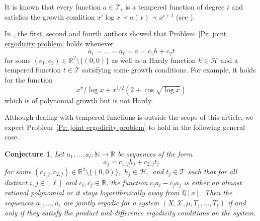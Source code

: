 \documentclass[11pt]{amsart}
\newtheorem{conjecture}[lemma]{Conjecture}
\theoremstyle{definition}
\newcommand{\N}{{\mathbb N}}
\newcommand{\Q}{{\mathbb Q}}
\newcommand{\R}{{\mathbb R}}
\newcommand{\CH}{{\mathcal H}}
\newcommand{\CX}{{\mathcal X}}
\newcommand{\1}{{\mathbf{1}}}
\begin{document}
It is known that every function $a\in \mathcal{T}_i$ is a tempered function of degree $i$ and satisfies the growth condition $x^i\log x\prec a(x)\prec x^{i+1}$ (see \cite{BeHK09}).

In \cite{DKS23}, the first, second and fourth authors showed that Problem~\ref{Pr: joint ergodicity problem} holds whenever $$a_1=\ldots=a_\ell=a=c_1h+c_2t$$ for some $(c_1,c_2)\in \mathbb{R}^2\setminus\{(0,0)\}$ as well as a Hardy function $h\in \CH$ and a tempered function $t\in \mathcal{T}$ satisfying some growth conditions. 
For example, it holds for the function 
\[x^{\pi}/ \log x+x^{1/2}(2+\cos\sqrt{\log x})\] which is of polynomial growth but is not Hardy.

Although dealing with tempered functions is outside the scope of this article, we expect Problem~\ref{Pr: joint ergodicity problem} to hold in the following general case.

\begin{conjecture}
Let $a_1, \ldots, a_\ell:\N\to\R$ be sequences of the form 
\[a_j=c_{1,j} h_j+c_{2,j}t_j\] for some $(c_{1,j},c_{2,j})\in \mathbb{R}^2\setminus\{(0,0)\},$ $h_j\in \CH,$ and $t_j\in \mathcal{T}$ such that for all distinct $i, j\in[\ell]$ and $c_i, c_j\in\R$, the function $c_i a_i - c_j a_j$ is either an almost rational polynomial or it stays logarithmically away from $\Q[x]$. Then the sequences $a_1, \ldots, a_\ell$ are jointly ergodic for a system $(X, \CX, \mu, T_1, \ldots, T_\ell)$ if and only  if they satisfy the product and difference ergodicity conditions on the system. 
\end{conjecture}














  

\end{document}

